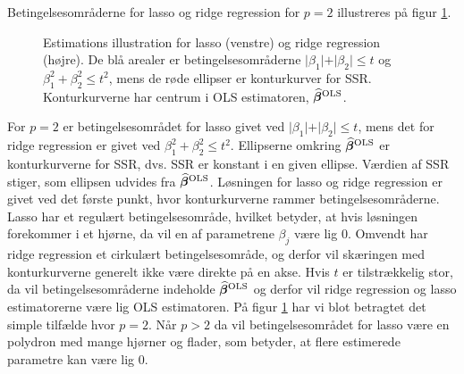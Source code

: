Betingelsesområderne for lasso og ridge regression for \(p=2\) illustreres på figur \ref{fig:LassoRig}.
%
\begin{figure}[H]
\centering
\begin{minipage}{0.4\linewidth}
\scalebox{0.7}{}
\end{minipage}
\hspace{0.2cm}
\begin{minipage}{0.4\linewidth}
\scalebox{0.7}{}
\end{minipage}
\caption{Estimations illustration for lasso (venstre) og ridge regression (højre). 
De blå arealer er betingelsesområderne $\vert \beta_1 \vert+\vert \beta_2 \vert \leq t$ og $\beta_1^2+\beta_2^2 \leq t^2$, mens de røde ellipser er konturkurver for SSR. Konturkurverne har centrum i OLS estimatoren, $\widehat{\boldsymbol{\beta}}^\text{OLS}$.} \label{fig:LassoRig}
\end{figure}
%
For $p=2$ er betingelsesområdet for lasso givet ved $\vert \beta_1 \vert + \vert \beta_2 \vert \leq t$, mens det for ridge regression er givet ved $\beta_1^2 + \beta_2^2 \leq t^2$.
Ellipserne omkring $\widehat{\boldsymbol{\beta}}^{\text{OLS}}$ er konturkurverne for SSR, dvs. SSR er konstant i en given ellipse. Værdien af SSR stiger, som ellipsen udvides fra $\widehat{\boldsymbol{\beta}}^{\text{OLS}}$.
Løsningen for lasso og ridge regression er givet ved det første punkt, hvor konturkurverne rammer betingelsesområderne.
Lasso har et regulært betingelsesområde, hvilket betyder, at hvis løsningen forekommer i et hjørne, da vil en af parametrene $\beta_j$ være lig 0.
Omvendt har ridge regression et cirkulært betingelsesområde, og derfor vil skæringen med konturkurverne generelt ikke være direkte på en akse.
Hvis $t$ er tilstrækkelig stor, da vil betingelsesområderne indeholde $\widehat{\boldsymbol{\beta}}^{\text{OLS}}$ og derfor vil ridge regression og lasso estimatorerne være lig OLS estimatoren.
På figur \ref{fig:LassoRig} har vi blot betragtet det simple tilfælde hvor $p=2$. 
Når \(p>2\) da vil betingelsesområdet for lasso være en polydron med mange hjørner og flader, som betyder, at flere estimerede parametre kan være lig 0.
%
